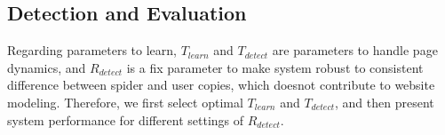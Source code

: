 %
%
%
%




%
%
%
%



\subsection{Detection and Evaluation}
Regarding parameters to learn, $T_{learn}$ and $T_{detect}$ are parameters to
handle page dynamics, and $R_{detect}$ is a fix parameter to make system 
robust to consistent difference between spider and user copies, which doesnot
contribute to website modeling. Therefore, 
we first select optimal $T_{learn}$ and $T_{detect}$, and then present
system performance for different settings of $R_{detect}$.


